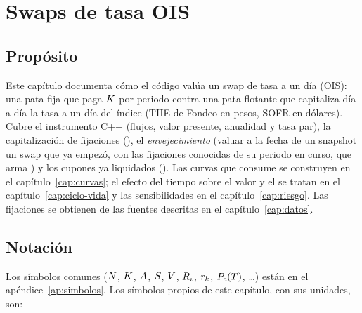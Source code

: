 \chapter{Swaps de tasa OIS}\label{cap:swaps-ois}

\section{Propósito}\label{sec:cap03-proposito}

Este capítulo documenta cómo el código valúa un swap de tasa a un día (OIS): una pata fija que paga $K$ por
periodo contra una pata flotante que capitaliza día a día la tasa a un día del índice (TIIE de Fondeo en
pesos, SOFR en dólares). Cubre el instrumento C++ 
(flujos, valor presente, anualidad y tasa par), la capitalización de fijaciones
(), el \emph{envejecimiento} (valuar a la fecha de
un snapshot un swap que ya empezó, con las fijaciones conocidas de su periodo en curso, que arma
) y los cupones ya liquidados
(). Las curvas que consume se construyen en el
capítulo~\ref{cap:curvas}; el efecto del tiempo sobre el valor y el \PnL{} se tratan en el
capítulo~\ref{cap:ciclo-vida} y las sensibilidades en el capítulo~\ref{cap:riesgo}. Las fijaciones se
obtienen de las fuentes descritas en el capítulo~\ref{cap:datos}.

\section{Notación}\label{sec:cap03-notacion}

Los símbolos comunes ($N$, $K$, $A$, $S$, $V$, $R_{i}$, $r_{k}$, $P_{c}(T)$, \dots) están en
el apéndice~\ref{ap:simbolos}. Los símbolos propios de este capítulo, con sus unidades, son:

